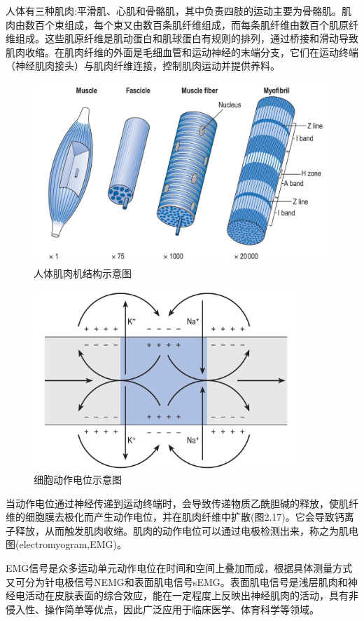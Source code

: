 人体有三种肌肉:平滑肌、心肌和骨骼肌，其中负责四肢的运动主要为骨骼肌。肌肉由数百个束组成，每个束又由数百条肌纤维组成，而每条肌纤维由数百个肌原纤维组成。这些肌原纤维是肌动蛋白和肌球蛋白有规则的排列，通过桥接和滑动导致肌肉收缩。在肌肉纤维的外面是毛细血管和运动神经的末端分支，它们在运动终端（神经肌肉接头）与肌肉纤维连接，控制肌肉运动并提供养料。
\begin{figure}[htb]
    \includegraphics[width=12cm]{fig/f43.jpg}
    \caption{人体肌肉机结构示意图\cite{p44}}
    \label{fig:mark}
\end{figure}

\begin{figure}[htb]
    \includegraphics[width=10cm]{fig/f42.png}
    \caption{细胞动作电位示意图\cite{p44}}
    \label{fig:mark}
\end{figure}

当动作电位通过神经传递到运动终端时，会导致传递物质乙酰胆碱的释放，使肌纤维的细胞膜去极化而产生动作电位，并在肌肉纤维中扩散(图2.17)。它会导致钙离子释放，从而触发肌肉收缩。肌肉的动作电位可以通过电极检测出来，称之为肌电图(electromyogram,EMG)。

EMG信号是众多运动单元动作电位在时间和空间上叠加而成，根据具体测量方式又可分为针电极信号NEMG和表面肌电信号sEMG。表面肌电信号是浅层肌肉和神经电活动在皮肤表面的综合效应，能在一定程度上反映出神经肌肉的活动，具有非侵入性、操作简单等优点，因此广泛应用于临床医学、体育科学等领域。

